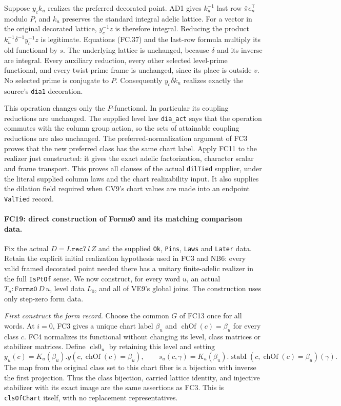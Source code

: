 \documentclass[11pt,a4paper]{article}
\numberwithin{equation}{section}
\theoremstyle{remark}\newtheorem{remark}[theorem]{Remark}
\begin{document}
Suppose $y_ck_u$ realizes the preferred decorated point. AD1 gives
$k_u^{-1}$ last row $\bar\pi e_n^{\mathsf T}$ modulo $P$,
and $k_u$ preserves the standard integral adelic lattice.
For a vector in the original decorated lattice, $y_c^{-1}z$ is
therefore integral. Reducing the product
$k_u^{-1}\delta^{-1}y_c^{-1}z$ is legitimate. Equations (FC.37)
and the last-row formula multiply its old functional by $s$.
The underlying lattice is unchanged, because $\delta$ and its inverse
are integral. Every auxiliary reduction, every other selected level-prime
functional, and every twist-prime frame is unchanged, since its place
is outside $v$. No selected prime is conjugate to $P$.
Consequently $y_c\delta k_u$ realizes exactly the source's
\texttt{dia1} decoration.

This operation changes only the $P$-functional. In particular its
coupling reductions are unchanged. The supplied level law
\texttt{dia\_\allowbreak act} says that the operation commutes with the column
group action, so the sets of attainable coupling reductions are also
unchanged. The preferred-normalization argument of FC3 proves that the
new preferred class has the same chart label. Apply FC11 to the
realizer just constructed: it gives the exact adelic factorization,
character scalar and frame transport. This proves all clauses of the
actual \texttt{dilTied} supplier, under the literal supplied column
laws and the chart realizability input. It also supplies the dilation
field required when CV9's chart values are made into an endpoint
\texttt{ValTied} record.

\paragraph{FC19: direct construction of Forms0 and its matching comparison data.}
Fix the actual $D=I.\texttt{rec7}\,l\,Z$ and the supplied
\texttt{Ok}, \texttt{Pins}, \texttt{Laws} and \texttt{Later} data.
Retain the explicit initial realization hypothesis used in FC3 and
NB6: every valid framed decorated point needed there has a unitary
finite-adelic realizer in the full \texttt{IsPtOf} sense.
We now construct, for every word $u$, an actual
$T_u:\texttt{Forms0}\,D\,u$, level data $L_0$, and all of
VE9's global joins. The construction uses only step-zero form data.

\emph{First construct the form record.}
Choose the common $G$ of FC13 once for all words. At $i=0$, FC3
gives a unique chart label $\beta_u$ and
$\operatorname{chOf}(c)=\beta_u$ for every class $c$. FC4 normalizes
its functional without changing its level, class matrices or stabilizer
matrices. Define $\operatorname{cls0}_u$ by retaining this level and
setting
\[
 y_u(c)=K_u(\beta_u).y(c,\operatorname{chOf}(c)=\beta_u),\qquad
 s_u(c,\gamma)=K_u(\beta_u).\operatorname{stabI}
                      (c,\operatorname{chOf}(c)=\beta_u)(\gamma).
 \tag{FC.38}
\]
The map from the original class set to this chart fiber is a bijection
with inverse the first projection. Thus the class bijection, carried
lattice identity, and injective stabilizer with its exact image are
the same assertions as FC3. This is \texttt{clsOfChart} itself,
with no replacement representatives.
\end{document}
